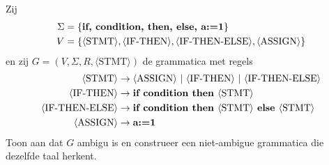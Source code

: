 \documentclass[a4paper]{article}
\newcommand{\rul}{\rightarrow}
\newcommand{\gvar}[1]{\langle \text{{#1}} \rangle}
\newcommand{\gend}[1]{\text{\bf{#1}}}
\begin{document}
\begin{question}
Zij 
\begin{align*}
  \Sigma & = \{ \gend{if, condition, then, else, a:=1} \} \\
  V & = \{ \gvar{STMT}, \gvar{IF-THEN}, \gvar{IF-THEN-ELSE}, \gvar{ASSIGN} \} \\
\end{align*}
  en zij $G = (V,\Sigma,R,\gvar{STMT})$ de grammatica met regels
  \begin{align*}                                                                               
      \gvar{STMT}          & \rul \gvar{ASSIGN} \ | \ \gvar{IF-THEN} \ | \ \gvar{IF-THEN-ELSE}  \\
      \gvar{IF-THEN}       & \rul \gend{if condition then } \gvar{STMT} \\
      \gvar{IF-THEN-ELSE}  & \rul \gend{if condition then } \gvar{STMT} \gend{ else } \gvar{STMT} \\
      \gvar{ASSIGN}        & \rul \gend{a:=1} \\
  \end{align*}
  Toon aan dat $G$ ambigu is en construeer een niet-ambigue grammatica die dezelfde taal herkent. 
\end{question}
\end{document}

